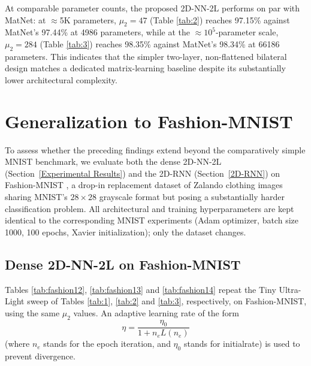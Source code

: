 \documentclass[pdflatex,sn-mathphys-num]{sn-jnl}%
\theoremstyle{thmstyleone}%
\theoremstyle{thmstyletwo}%
\theoremstyle{thmstylethree}%
\begin{document}
At comparable parameter counts, the proposed 2D-NN-2L performs on par with MatNet: at $\approx$5K parameters, $\mu_2=47$ (Table \ref{tab:2}) reaches 97.15\% against MatNet's 97.44\% at 4986 parameters, while at the $\approx$$10^5$-parameter scale, $\mu_2=284$ (Table \ref{tab:3}) reaches 98.35\% against MatNet's 98.34\% at 66186 parameters. This indicates that the simpler two-layer, non-flattened bilateral design matches a dedicated matrix-learning baseline despite its substantially lower architectural complexity.



\section{Generalization to Fashion-MNIST}\label{Fashion-MNIST}
To assess whether the preceding findings extend beyond the comparatively simple MNIST benchmark, we evaluate both the dense 2D-NN-2L (Section~\ref{Experimental Results}) and the 2D-RNN (Section~\ref{2D-RNN}) on Fashion-MNIST \cite{FashionMNIST}, a drop-in replacement dataset of Zalando clothing images sharing MNIST's $28\times28$ grayscale format but posing a substantially harder classification problem. All architectural and training hyperparameters are kept identical to the corresponding MNIST experiments (Adam optimizer, batch size 1000, 100 epochs, Xavier initialization); only the dataset changes.

\subsection{Dense 2D-NN-2L on Fashion-MNIST}

Tables \ref{tab:fashion12}, \ref{tab:fashion13} and \ref{tab:fashion14} repeat the Tiny Ultra-Light sweep of Tables \ref{tab:1}, \ref{tab:2} and \ref{tab:3}, respectively, on Fashion-MNIST, using the same $\mu_2$ values. An adaptive learning rate of the form 
 $$\eta=\frac{\eta_0}{1+ n_e L(n_e)}$$
 (where $n_e$ stands for the epoch iteration, and $\eta_0$ stands for initialrate)
 is used to prevent divergence. 
\end{document}
